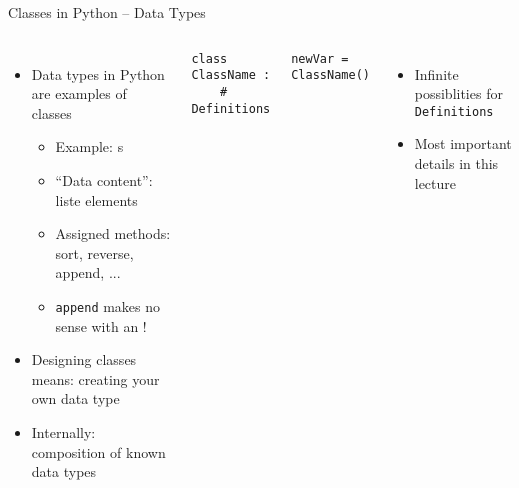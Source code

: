 \begin{frame}[fragile]{Classes in Python -- Data Types}
%
\begin{columns}[T]
\begin{itemize}
\item Data types in Python are examples of classes
	\begin{itemize}
	\item Example: s
	\item \enquote{Data content}: liste elements
	\item Assigned methods: sort, reverse, append, ...
	\item \texttt{append} makes no sense with an !
	\end{itemize}
\item Designing classes means: creating your own data type
\item Internally: composition of known data types
\end{itemize}
%
\begin{codebox}
\begin{verbatim}
class ClassName :
    # Definitions
\end{verbatim}
\end{codebox}

\begin{codebox}
\begin{verbatim}
newVar = ClassName()
\end{verbatim}
\end{codebox}
\begin{itemize}
\item Infinite possiblities for \texttt{Definitions}
\item Most important details in this lecture
\end{itemize}
\end{columns}
%
\end{frame}


